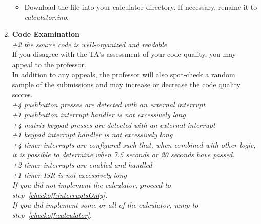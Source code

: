 \begin{enumerate}
    \begin{itemize}
    \item Download the file into your calculator directory. If necessary,
        rename it to \textit{calculator.ino}.
    \end{itemize}
\item[] \textbf{Code Examination}
 \\
    \textit{+2 the source code is well-organized and readable} \\
    {\tiny If you disagree with the TA's assessment of your code quality, you may appeal to the professor.} \\
    {\tiny In addition to any appeals, the professor will also spot-check a random sample of the submissions and may increase or decrease the code quality scores.}
 \\
    \textit{+4 pushbutton presses are detected with an external interrupt} \\
    \textit{+1 pushbutton interrupt handler is not excessively long} \\
    \textit{+4 matrix keypad presses are detected with an external interrupt} \\
    \textit{+1 keypad interrupt handler is not excessively long}
 \\
    \textit{+4 timer interrupts are configured such that, when combined with other logic, it is possible to determine when 7.5 seconds or 20 seconds have passed.}
 \\
    \textit{+2 timer interrupts are enabled and handled} \\
    \textit{+1 timer ISR is not excessively long}
\vspace{.5cm} \\
\textit{If you did not implement the calculator, proceed to step~\ref{checkoff:interruptsOnly}.} \\
\textit{If you did implement some or all of the calculator, jump to step~\ref{checkoff:calculator}.} \\ \\


\end{enumerate}
